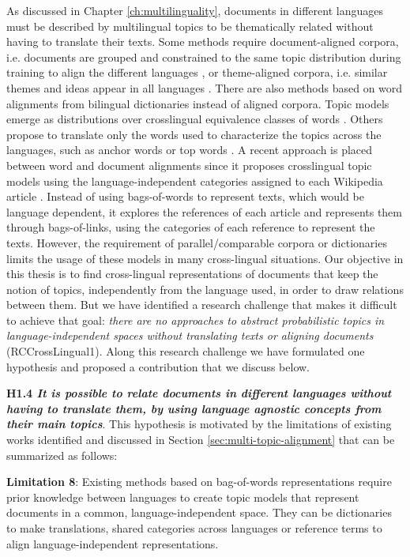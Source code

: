 As discussed in Chapter \ref{ch:multilinguality}, documents in different languages must be described by multilingual topics to be thematically related without having to translate their texts. Some methods require document-aligned corpora, i.e. documents are grouped and constrained to the same topic distribution during training to align the different languages \citep{mimno-etal-2009-polylingual, Ni2009, Fukumasu2012, Zhang2013}, or theme-aligned corpora, i.e. similar themes and ideas appear in all languages \citep{Graber2009}. There are also methods based on word alignments from bilingual dictionaries instead of aligned corpora. Topic models emerge as distributions over crosslingual equivalence classes of words \citep{Jagarlamudi2010, zhang-etal-2010-cross, shi-etal-2016-detecting, hao-paul-2018-learning}. Others propose to translate only the words used to characterize the topics across the languages, such as anchor words \citep{NEURIPS2018_28b9f8aa} or top words \citep{yang2019multilingual}. A recent approach is placed between word and document alignments since it proposes crosslingual topic models using the language-independent categories assigned to each Wikipedia article \citep{2020arXiv200911207P}. Instead of using bags-of-words to represent texts, which would be language dependent, it explores the references of each article and represents them through bags-of-links, using the categories of each reference to represent the texts. However, the requirement of parallel/comparable corpora or dictionaries limits the usage of these models in many cross-lingual situations. Our objective in this thesis is to find cross-lingual representations of documents that keep the notion of topics, independently from the language used, in order to draw relations between them. But we have identified a research challenge that makes it difficult to achieve that goal: \textit{there are no approaches to abstract probabilistic topics in language-independent spaces without translating texts or aligning documents} (RCCrossLingual1). Along this research challenge we have formulated one hypothesis and proposed a contribution that we discuss below.

\textbf{H1.4 \textit{It is possible to relate documents in different languages without having to translate them, by using language agnostic concepts from their main topics}}. This hypothesis is motivated by the limitations of existing works identified and discussed in Section \ref{sec:multi-topic-alignment} that can be summarized as follows:

\textbf{Limitation 8}: Existing methods based on bag-of-words representations require prior knowledge between languages to create topic models that represent documents in a common, language-independent space. They can be dictionaries to make translations, shared categories across languages or reference terms to align language-independent representations.

